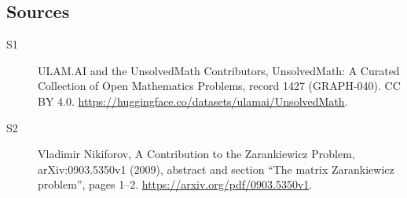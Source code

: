 \documentclass[11pt]{article}
\begin{document}
\subsection{Sources}
\begin{description}
\item[\hypertarget{source:1427:1}{S1}] ULAM.AI and the UnsolvedMath Contributors, UnsolvedMath: A Curated Collection of Open Mathematics Problems, record 1427 (GRAPH-040). CC BY 4.0. \url{https://huggingface.co/datasets/ulamai/UnsolvedMath}.
\item[\hypertarget{source:1427:2}{S2}] Vladimir Nikiforov, A Contribution to the Zarankiewicz Problem, arXiv:0903.5350v1 (2009), abstract and section “The matrix Zarankiewicz problem”, pages 1--2. \url{https://arxiv.org/pdf/0903.5350v1}.
\end{description}
\label{end:1427}
\end{document}

